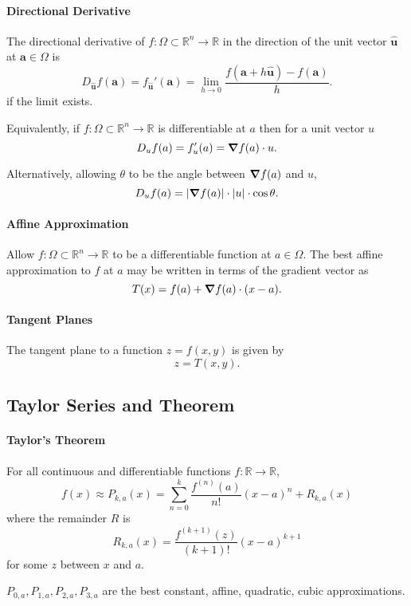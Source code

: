\paragraph{Directional Derivative}
The directional derivative of \(f: \Omega \subset \mathbb R^n \to \mathbb R\)
in the direction of the unit vector \(\hat{\textbf{u}}\) at \(\textbf{a}\in \Omega\) is
\[
    D_{\hat{\textbf{u}}}f(\textbf{a})=f_{\hat{\textbf{u}}}'(\textbf{a})=\lim_{h\to 0}
    \frac{f(\textbf{a}+h\hat{\textbf{u}})-f(\textbf{a})}{h}.
\]
if the limit exists.

Equivalently, if \(f: \Omega \subset \mathbb{R}^n \to \mathbb{R}\)
is differentiable at \(a\) then for a unit vector \(u\)
\[
    D_u f(a) = f_u'(a) = \grad f(a)\cdot u.
\]

Alternatively, allowing \(\theta\) to be the angle between
\(\grad f(a)\) and \(u\),
\[D_u f(a) = |\grad f(a)| \cdot |u| \cdot \cos\theta.\]

\paragraph{Affine Approximation}
Allow \(f:\Omega\subset\mathbb{R}^n \to \mathbb{R}\) to be a differentiable
function at \(a\in \Omega\).
The best affine approximation to \(f\) at \(a\) may be written in terms of
the gradient vector as
\[
    T(x) = f(a) + \grad f(a) \cdot (x-a).
\]

\paragraph{Tangent Planes}
The tangent plane to a function \(z = f(x, y)\) is given by
\[ z = T(x, y).\]

\subsection{Taylor Series and Theorem}

\paragraph{Taylor's Theorem}
For all continuous and differentiable functions \(f: \mathbb{R}\to \mathbb{R}\),
\[
    f(x)
    \approx
    P_{k,a}(x) = 
    \sum_{n=0}^{k} \frac{f^{(n)}(a)}{n!} (x-a)^n
    + R_{k,a}(x)
\]
where the remainder \(R\) is
\[
    R_{k,a}(x) = \frac{f^{(k+1)}(z)}{(k+1)!} (x-a)^{k+1}
\]
for some \(z\) between \(x\) and \(a\).

\(P_{0,a}, P_{1,a},  P_{2,a}, P_{3,a}\) are the best constant, affine, quadratic, cubic
approximations.

